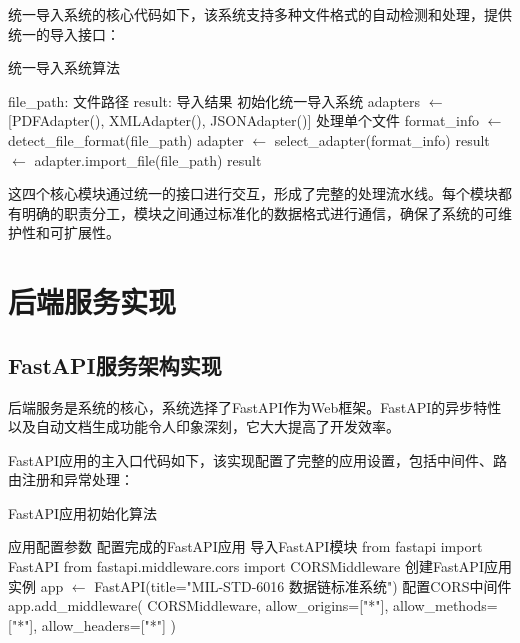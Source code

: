 统一导入系统的核心代码如下，该系统支持多种文件格式的自动检测和处理，提供统一的导入接口：

\begin{algorithm}[H]
\caption{统一导入系统算法}
\begin{algorithmic}[1]
\REQUIRE file\_path: 文件路径
\ENSURE result: 导入结果
\STATE 初始化统一导入系统
\STATE adapters $\leftarrow$ [PDFAdapter(), XMLAdapter(), JSONAdapter()]
\STATE 处理单个文件
\STATE format\_info $\leftarrow$ detect\_file\_format(file\_path)
\STATE adapter $\leftarrow$ select\_adapter(format\_info)
\STATE result $\leftarrow$ adapter.import\_file(file\_path)
\RETURN result
\end{algorithmic}
\end{algorithm}

这四个核心模块通过统一的接口进行交互，形成了完整的处理流水线。每个模块都有明确的职责分工，模块之间通过标准化的数据格式进行通信，确保了系统的可维护性和可扩展性。





\section{后端服务实现}

\subsection{FastAPI服务架构实现}

后端服务是系统的核心，系统选择了FastAPI作为Web框架。FastAPI的异步特性以及自动文档生成功能令人印象深刻，它大大提高了开发效率。

FastAPI应用的主入口代码如下，该实现配置了完整的应用设置，包括中间件、路由注册和异常处理：

\begin{algorithm}[H]
\caption{FastAPI应用初始化算法}
\begin{algorithmic}[1]
\REQUIRE 应用配置参数
\ENSURE 配置完成的FastAPI应用
\STATE 导入FastAPI模块
\STATE from fastapi import FastAPI
\STATE from fastapi.middleware.cors import CORSMiddleware
\STATE 创建FastAPI应用实例
\STATE app $\leftarrow$ FastAPI(title="MIL-STD-6016 数据链标准系统")
\STATE 配置CORS中间件
\STATE app.add\_middleware(
\STATE     CORSMiddleware,
\STATE     allow\_origins=["*"],
\STATE     allow\_methods=["*"],
\STATE     allow\_headers=["*"]
\STATE )
\end{algorithmic}
\end{algorithm}


